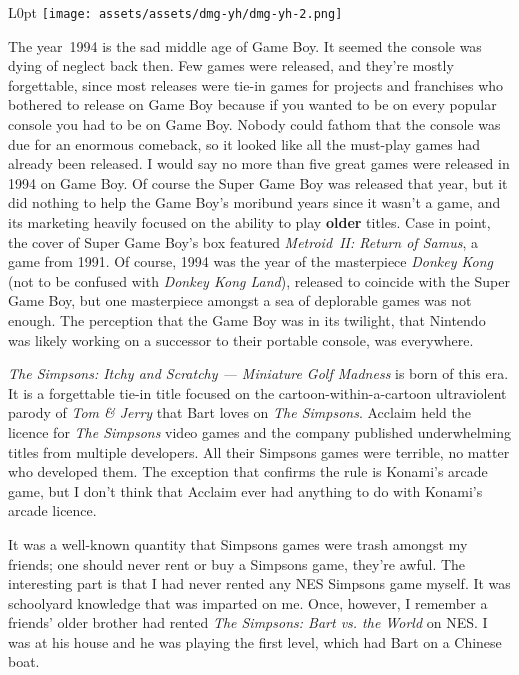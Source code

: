 \documentclass{book}
\begin{document}
\begin{wrapfigure}{L}{0pt} \texttt{[image: assets/assets/dmg-yh/dmg-yh-2.png]}\end{wrapfigure}
The year 1994 is the sad middle age of Game Boy. It seemed the console was dying of neglect back then. Few games were released, and they’re mostly forgettable, since most releases were tie-in games for projects and franchises who bothered to release on Game Boy because if you wanted to be on every popular console you had to be on Game Boy. Nobody could fathom that the console was due for an enormous comeback, so it looked like all the must-play games had already been released. I would say no more than five great games were released in 1994 on Game Boy. Of course the Super Game Boy was released that year, but it did nothing to help the Game Boy’s moribund years since it wasn’t a game, and its marketing heavily focused on the ability to play \textbf{older} titles. Case in point, the cover of Super Game Boy’s box featured \emph{Metroid II: Return of Samus}, a game from 1991. Of course, 1994 was the year of the masterpiece \emph{Donkey Kong} (not to be confused with \emph{Donkey Kong Land}), released to coincide with the Super Game Boy, but one masterpiece amongst a sea of deplorable games was not enough. The perception that the Game Boy was in its twilight, that Nintendo was likely working on a successor to their portable console, was everywhere.

\emph{The Simpsons: Itchy and Scratchy — Miniature Golf Madness} is born of this era. It is a forgettable tie-in title focused on the cartoon-within-a-cartoon ultraviolent parody of \emph{Tom \& Jerry} that Bart loves on \emph{The Simpsons}. Acclaim held the licence for \emph{The Simpsons} video games and the company published underwhelming titles from multiple developers. All their Simpsons games were terrible, no matter who developed them. The exception that confirms the rule is Konami’s arcade game, but I don’t think that Acclaim ever had anything to do with Konami’s arcade licence.

It was a well-known quantity that Simpsons games were trash amongst my friends; one should never rent or buy a Simpsons game, they’re awful. The interesting part is that I had never rented any NES Simpsons game myself. It was schoolyard knowledge that was imparted on me. Once, however, I remember a friends’ older brother had rented \emph{The Simpsons: Bart vs. the World} on NES. I was at his house and he was playing the first level, which had Bart on a Chinese boat.
\end{document}
